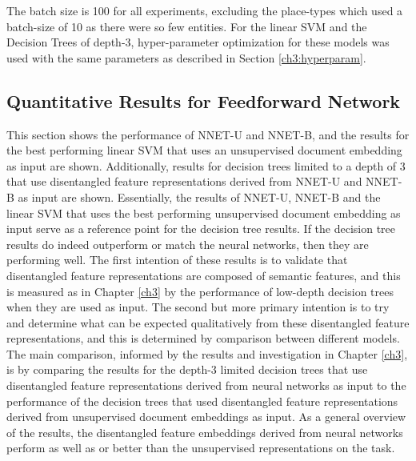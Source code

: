 The batch size is 100 for all experiments, excluding the place-types which used a batch-size of 10 as there were so few entities. For the linear SVM and the Decision Trees of depth-3, hyper-parameter optimization for these models was used with the same parameters as described in Section \ref{ch3:hyperparam}.


\subsection{Quantitative Results for Feedforward Network}\label{quan-feed}

This section shows the performance  of NNET-U and NNET-B,  and the results for the best performing linear SVM that uses an unsupervised document embedding as input are shown. Additionally, results for decision trees limited to a depth of 3 that use disentangled feature representations derived from NNET-U and NNET-B as input are shown. Essentially, the results of NNET-U, NNET-B and the linear SVM that uses the best performing unsupervised document embedding as input serve as a reference point for the decision tree results. If the decision tree results do indeed outperform or match the neural networks, then they are performing well.  The first intention of these results is to validate that  disentangled feature representations are composed of semantic features, and this is measured as in Chapter \ref{ch3} by the performance of low-depth decision trees when they are used as input.  The second but more primary intention is to try and determine what can be expected qualitatively from these disentangled feature representations, and this is determined by comparison between different models. The main comparison, informed by the results and investigation in Chapter \ref{ch3}, is by comparing the results for the depth-3 limited decision trees that use  disentangled feature representations derived from neural networks as input to the performance of the decision trees that used disentangled feature representations derived from unsupervised document embeddings as input. %
As a general overview of the results,  the disentangled feature embeddings derived from neural networks perform as well as or better than the unsupervised representations on the task. 

